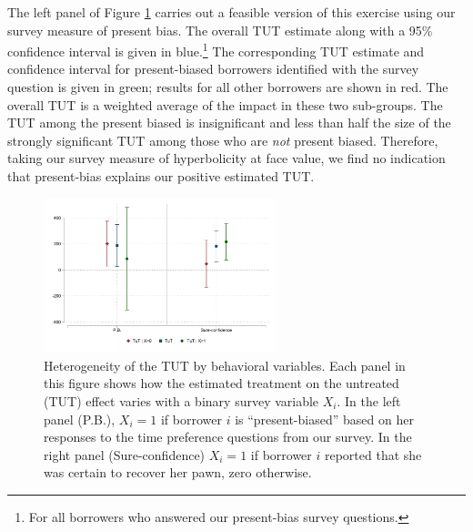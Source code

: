 \documentclass[ecta,nameyear,final]{econsocart}
\begin{document}
The left panel of Figure \ref{tut_beh_partition} carries out a feasible version of this exercise using our survey measure of present bias.
The overall TUT estimate along with a 95\% confidence interval is given in blue.\footnote{For all borrowers who answered our present-bias survey questions.}
The corresponding TUT estimate and confidence interval for present-biased borrowers identified with the survey question is given in green; results for all other borrowers are shown in red.
The overall TUT is a weighted average of the impact in these two sub-groups.  The TUT among the present biased is insignificant and less than half the size of the strongly significant TUT among those who are \textit{not} present biased. Therefore, taking our survey measure of hyperbolicity at face value, we find no indication that present-bias explains our positive estimated TUT. 



\begin{figure}
    \begin{center}
        \centering
        \includegraphics[width=0.6\textwidth]{Figuras/tut_beh_partition.pdf} 
    \end{center}
     \scriptsize  
\caption{Heterogeneity of the TUT by behavioral variables. Each panel in this figure shows how the estimated treatment on the untreated (TUT) effect varies with a binary survey variable $X_i$. In the left panel (P.B.), $X_i = 1$ if borrower $i$ is ``present-biased'' based on her responses to the time preference questions from our survey. In the right panel (Sure-confidence) $X_i = 1$ if  borrower $i$ reported that she was certain to recover her pawn, zero otherwise. 
}
    \label{tut_beh_partition}

\end{figure}
\end{document}
